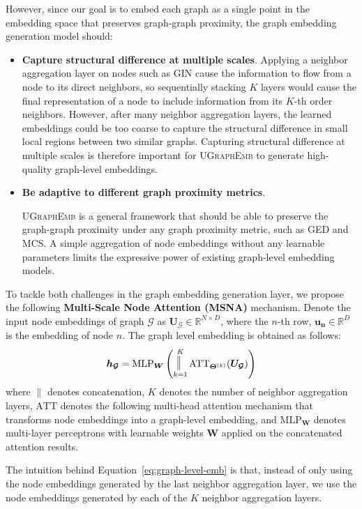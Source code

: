 \documentclass{article}
\newcommand{\model}{\textsc{UGraphEmb}\xspace}
\newcommand{\gin}{\textsc{GIN}\xspace}
\DeclareMathOperator*{\concat}{\scalebox{1}[1.5]{$\parallel$}}
\begin{document}
However, since our goal is to embed each graph as a single point in the embedding space that preserves graph-graph proximity,
the graph embedding generation model should:
\begin{itemize}
    \item \textbf{{Capture structural difference at multiple scales}}.
    Applying a neighbor aggregation layer on nodes such as \gin cause the information to flow from a node to its direct neighbors, so sequentially stacking $K$ layers would cause the final representation of a node to include information from its $K$-th order neighbors. 
However, after many neighbor aggregation layers, the learned embeddings could be too coarse to capture the structural difference in small local regions between two similar graphs.
Capturing structural difference at multiple scales is therefore important for \model to generate high-quality graph-level embeddings.
    
    \item \textbf{{Be adaptive to different graph proximity metrics}}.
    
    \model is a general framework that should be able to preserve the graph-graph proximity under any graph proximity metric, such as GED and MCS. A simple aggregation of node embeddings without any learnable parameters limits the expressive power of existing graph-level embedding models.
\end{itemize}

To tackle both challenges in the graph embedding generation layer, we propose the following \textbf{Multi-Scale Node Attention (MSNA)} mechanism. Denote the input node embeddings of graph $\mathcal{G}$ as $\bm{U_{\mathcal{G}}} \in \mathbb{R}^{N \times D}$, where the $n$-th row, $\bm{u_n} \in \mathbb{R}^{D}$ is the embedding of node $n$. The graph level embedding is obtained as follows:
\begin{align} 
\label{eq:graph-level-emb}
\bm{h_{\mathcal{G}}} = \mathrm{MLP}_{\bm{W}} \left( \concat_{k=1}^K  {\mathrm{ATT}_{\bm{\Theta}^{(k)}}} (\bm{U_{\mathcal{G}}}) \right)
\end{align}
where $\parallel$ denotes concatenation, $K$ denotes the number of neighbor aggregation layers, $\mathrm{ATT}$ denotes the following multi-head attention mechanism that transforms node embeddings into a graph-level embedding, and $\mathrm{MLP}_{\bm{W}}$ denotes multi-layer perceptrons with learnable weights $\bm{W}$ applied on the concatenated attention results. 

The intuition behind Equation~\ref{eq:graph-level-emb} is that, instead of only using the node embeddings generated by the last neighbor aggregation layer, we use the node embeddings generated by each of the $K$ neighbor aggregation layers. 
\end{document}
